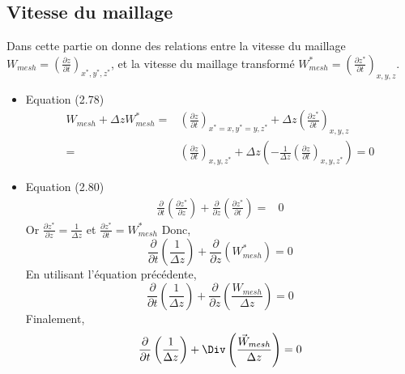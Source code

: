 \subsection*{Vitesse du maillage}
Dans cette partie on donne des relations entre la vitesse du maillage $W_{mesh} = \left(\frac{\partial z}{\partial t}\right)_{x^*,y^*,z^*}$, et la vitesse du maillage transformé $W^*_{mesh} = \left(\frac{\partial z^*}{\partial t}\right)_{x,y,z}$.
\begin{itemize}
\item Equation (2.78)
\begin{align*}
W_{mesh} + \Delta z W^*_{mesh} = & \left(\frac{\partial z}{\partial t}\right)_{x^* =x,y^* =y,z^*} + \Delta z \left(\frac{\partial z^*}{\partial t}\right)_{x,y,z} \\
=& \left(\frac{\partial z}{\partial t}\right)_{x,y,z^*} + \Delta z \left( - \frac{1}{\Delta z} \left(\frac{\partial z}{\partial t}\right)_{x,y,z^*} \right) = 0
\end{align*} 
\item Equation (2.80)
\begin{align*}
\frac{\partial}{\partial t} \left(\frac{\partial z^*}{\partial z}\right) +\frac{\partial}{\partial z} \left(\frac{\partial z^*}{\partial t}\right) =& 0
\end{align*}
Or $\frac{\partial z^*}{\partial z} = \frac{1}{\Delta z} $ et $\frac{\partial z^*}{\partial t} = W^*_{mesh}$
Donc,
\[\frac{\partial}{\partial t} \left(\frac{1}{\Delta z} \right) +\frac{\partial}{\partial z} \left( W^*_{mesh} \right) = 0 \]
En utilisant l'équation précédente, 
\[\frac{\partial}{\partial t} \left(\frac{1}{\Delta z} \right) +\frac{\partial}{\partial z} \left(\frac{ W_{mesh}}{\Delta z} \right) = 0\]
Finalement,
\[\frac{\partial}{\partial t} \left(\frac{1}{\Delta z} \right) +\Div \left(\frac{ \vec{W}_{mesh}}{\Delta z} \right) = 0 \]
\end{itemize}
